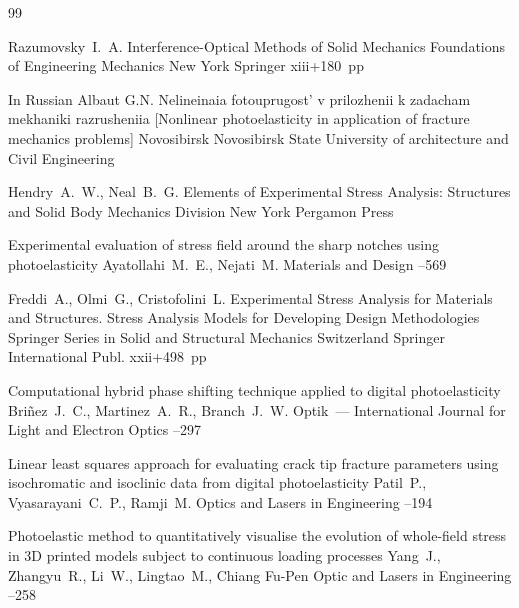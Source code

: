 \begin{thebibliography}{99}

\by Razumovsky~I.~A.
\book Interference-Optical Methods of Solid Mechanics
\serial Foundations of Engineering Mechanics
\publaddr New York
\publ Springer
\totalpages xiii+180~pp \nofrills
{}


\lang In Russian
\by Albaut G.N.
\book Nelineinaia fotouprugost' v prilozhenii k zadacham mekhaniki razrusheniia \rm [Nonlinear photoelasticity in application of fracture mechanics problems]
\publaddr Novosibirsk
\publ Novosibirsk State University of architecture and Civil Engineering


\by Hendry~A.~W., Neal~B.~G.
\book Elements of Experimental Stress Analysis: Structures and Solid Body Mechanics Division
\publaddr New York
\publ Pergamon Press 

\paper Experimental evaluation of stress field around the sharp notches using photoelasticity
\by  Ayatollahi~M.~E., Nejati~M.
\jour  Materials and Design
--569

\by Freddi~A., Olmi~G., Cristofolini~L.  
\book Experimental Stress Analysis for Materials and Structures. 
Stress Analysis Models for Developing Design Methodologies
\serial Springer Series in Solid and Structural Mechanics
\publaddr Switzerland
\publ Springer International Publ.
\totalpages xxii+498~pp \nofrills
{}


\paper Computational hybrid phase shifting technique applied to digital photoelasticity
\by  Bri\~nez~J.~C., Martinez~A.~R., Branch~J.~W.
\jour  Optik~--- International Journal for Light and Electron Optics
--297


\paper Linear least squares approach for evaluating crack tip fracture parameters using isochromatic and isoclinic data from digital photoelasticity
\by   Patil~P., Vyasarayani~C.~P., Ramji~M.
\jour  Optics and Lasers in Engineering
--194


\paper Photoelastic method to quantitatively visualise the evolution of whole-field stress in 3D printed models subject to continuous loading processes
\by  Yang~J., Zhangyu~R., Li~W., Lingtao~M., Chiang Fu-Pen
\jour  Optic and Lasers in Engineering
--258



\end{thebibliography}
